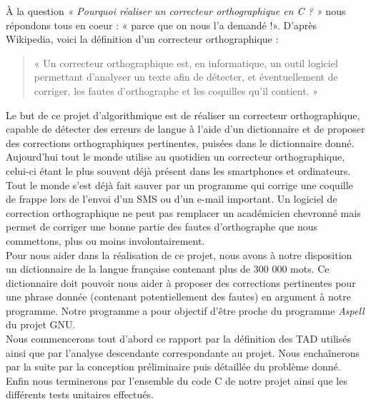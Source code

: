 À la question \textit{« Pourquoi réaliser un correcteur orthographique en C ? »} nous répondons tous en coeur : « parce que on nous l'a demandé !». D'après Wikipedia, voici la définition d'un correcteur orthographique :
\begin{quote}
	« Un correcteur orthographique est, en informatique, un outil logiciel permettant d'analyser un texte afin de détecter, et éventuellement de corriger, les fautes d'orthographe et les coquilles qu'il contient. »
\end{quote}
\vspace{20px}
Le but de ce projet d'algorithmique est de réaliser un correcteur orthographique, capable de détecter des erreurs de langue à l'aide d'un dictionnaire et de proposer des corrections orthographiques pertinentes, puisées dans le dictionnaire donné.\\

Aujourd'hui tout le monde utilise au quotidien un correcteur orthographique, celui-ci étant le plus souvent déjà présent dans les smartphones et ordinateurs. Tout le monde s'est déjà fait sauver par un programme qui corrige une coquille de frappe lors de l'envoi d'un SMS ou d'un e-mail important. Un logiciel de correction orthographique ne peut pas remplacer un académicien chevronné mais permet de corriger une bonne partie des fautes d'orthographe que nous commettons, plus ou moins involontairement.\\

Pour nous aider dans la réalisation de ce projet, nous avons à notre disposition un dictionnaire de la langue française contenant plus de 300 000 mots. Ce dictionnaire doit pouvoir nous aider à proposer des corrections pertinentes pour une phrase donnée (contenant potentiellement des fautes) en argument à notre programme. Notre programme a pour objectif d'être proche du programme \textit{Aspell} du projet GNU.\\

Nous commencerons tout d'abord ce rapport par la définition des TAD utilisés ainsi que par l'analyse descendante correspondante au projet. Nous enchaînerons par la suite par la conception préliminaire puis détaillée du problème donné. Enfin nous terminerons par l'ensemble du code C de notre projet ainsi que les différents tests unitaires effectués.